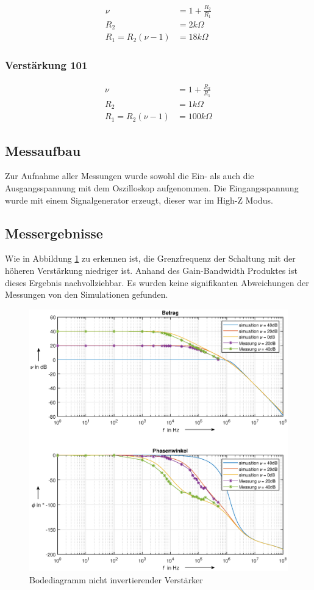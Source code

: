 \begin{align}
    \nu &= 1+ \frac{R_2}{R_1}\\
    R_2 &= 2k\Omega\\
    R_1 = R_2(\nu - 1) &= 18 k\Omega
\end{align}

\subsubsection{Verstärkung 101}

\begin{align}
    \nu &= 1+ \frac{R_2}{R_1}\\
    R_2 &= 1k\Omega\\
    R_1 = R_2(\nu - 1) &= 100 k\Omega
\end{align}

\subsection{Messaufbau}
Zur Aufnahme aller Messungen wurde sowohl die Ein- als auch die Ausgangsspannung mit dem Oszilloskop aufgenommen. Die Eingangsspannung wurde mit einem Signalgenerator erzeugt, dieser war im High-Z Modus. 


\subsection{Messergebnisse}
Wie in Abbildung \ref{fig:bode_niinv} zu erkennen ist, die Grenzfrequenz der Schaltung mit der höheren Verstärkung niedriger ist. Anhand des Gain-Bandwidth Produktes ist dieses Ergebnis nachvollziehbar. Es wurden keine signifikanten Abweichungen der Messungen von den Simulationen gefunden. 
\begin{figure}[H]
    \centering
    \includegraphics[width=\costumPlotWidth]{Lab_1/Plots/niinv_verst.eps}
    \caption{Bodediagramm nicht invertierender Verstärker}
    \label{fig:bode_niinv}
\end{figure}

